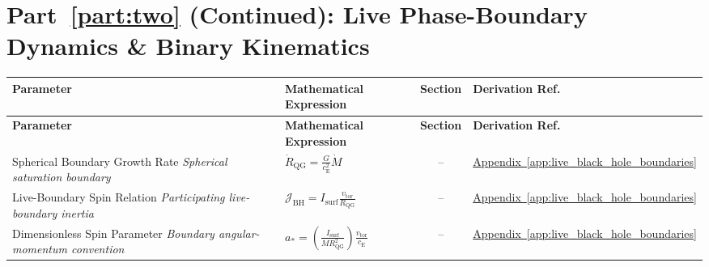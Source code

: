 \par\ifdim\dimexpr\pagegoal-\pagetotal\relax<12\baselineskip\newpage\fi
\section*{Part~\ref{part:two} (Continued): Live Phase-Boundary Dynamics \& Binary Kinematics}

\vspace{0.5cm}
\noindent
\begin{longtable}{@{} p{4.5cm} p{6cm} c p{4cm} @{}}
\toprule
\textbf{Parameter} & \textbf{Mathematical Expression} & \textbf{Section} & \textbf{Derivation Ref.} \\
\midrule
\endfirsthead
\toprule
\textbf{Parameter} & \textbf{Mathematical Expression} & \textbf{Section} & \textbf{Derivation Ref.} \\
\midrule
\endhead

{\raggedright Spherical Boundary Growth Rate \newline \textit{Spherical saturation boundary}\par} & {\raggedright $\dot{R}_{\mathrm{QG}} = \frac{G}{c_{\mathrm{E}}^2}\dot{M}$\par} & -- & {\raggedright \hyperref[app:live_black_hole_boundaries]{Appendix~\ref*{app:live_black_hole_boundaries}}\par} \\

{\raggedright Live-Boundary Spin Relation \newline \textit{Participating live-boundary inertia}\par} & {\raggedright $\mathcal{J}_{\mathrm{BH}} = I_{\mathrm{surf}} \frac{v_{\mathrm{tor}}}{R_{\mathrm{QG}}}$\par} & -- & {\raggedright \hyperref[app:live_black_hole_boundaries]{Appendix~\ref*{app:live_black_hole_boundaries}}\par} \\

{\raggedright Dimensionless Spin Parameter \newline \textit{Boundary angular-momentum convention}\par} & {\raggedright $a_\ast = \left( \frac{I_{\mathrm{surf}}}{M R_{\mathrm{QG}}^2} \right) \frac{v_{\mathrm{tor}}}{c_{\mathrm{E}}}$\par} & -- & {\raggedright \hyperref[app:live_black_hole_boundaries]{Appendix~\ref*{app:live_black_hole_boundaries}}\par} \\


\end{longtable}
